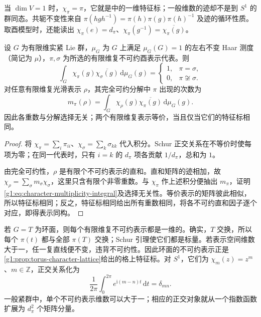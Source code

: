 当 \(\dim V=1\) 时，\(\chi_\pi=\pi\)，它就是中的一维特征标；一般维数的迹却不是到 \(S^1\) 的群同态。共轭不变性来自 \(\pi(hgh^{-1})=\pi(h)\pi(g)\pi(h)^{-1}\) 及迹的循环性质。取酉模型时，还能读出 \(\chi_\pi(e)=d_\pi\)、\(\chi_\pi(g^{-1})=\overline{\chi_\pi(g)}\)。

\begin{corollary}\label{g1:cor:character-orthogonality}
	设 \(G\) 为有限维实紧 Lie 群，\(\mu_G\) 为 \(G\) 上满足 \(\mu_G(G)=1\) 的左右不变 Haar 测度（简记为 \(\mu\)），\(\pi,\sigma\) 为所选的有限维复不可约酉表示代表。则
	\[
		\int_G\chi_\pi(g)\overline{\chi_\sigma(g)}\,\mathrm{d}\mu_G(g)
		=\begin{cases}1,&\pi=\sigma,\\0,&\pi\not\cong\sigma.\end{cases}
	\]
	对任意有限维复光滑表示 \(\rho\)，其完全可约分解中 \(\pi\) 出现的次数为
	\begin{equation}\label{g1:eq:character-multiplicity-integral}
		m_\pi(\rho)=\int_G\chi_\rho(g)\overline{\chi_\pi(g)}\,\mathrm{d}\mu_G(g).
	\end{equation}
	因此各重数与分解选择无关；两个有限维复表示等价，当且仅当它们的特征标相同。
\end{corollary}
\begin{proof}
	将 \(\chi_\pi=\sum_i\pi_{ii}\)、\(\chi_\sigma=\sum_k\sigma_{kk}\) 代入积分。Schur 正交关系在不等价时使每项为零；在同一代表时，只有 \(i=k\) 的 \(d_\pi\) 项各贡献 \(1/d_\pi\)，总和为 \(1\)。

	由完全可约性，\(\rho\) 是有限个不可约表示的直和。直和矩阵的迹相加，故 \(\chi_\rho=\sum_\sigma m_\sigma\chi_\sigma\)，这里只含有限个非零重数。与 \(\chi_\pi\) 作上述积分便抽出 \(m_\pi\)，证明\eqref{g1:eq:character-multiplicity-integral}及选择无关性。等价表示的矩阵彼此相似，所以特征标相同；反之，特征标相同给出所有重数相同，将各不可约直和因子逐个对应，即得表示同构。
\end{proof}

\begin{example}\label{g1:exm:torus-irreducible-representations}
	若 \(G=T\) 为环面，则每个有限维复不可约表示都是一维的。确实，\(T\) 交换，所以每个 \(\pi(t)\) 都与全部 \(\pi(T)\) 交换；Schur 引理使它们都是标量。若表示空间维数大于一，任一复直线便不变，违背不可约性。因此环面的不可约表示正是\cref{g1:prop:torus-character-lattice}给出的格上特征标。对 \(S^1\)，它们为 \(\chi_m(z)=z^m\)、\(m\in\mathbb Z\)，正交关系化为
	\[
		\frac1{2\pi}\int_0^{2\pi}e^{\mathrm{i}(m-n)t}\,\mathrm{d}t=\delta_{mn}.
	\]
	一般紧群中，单个不可约表示维数可以大于一；相应的正交对象就从一个指数函数扩展为 \(d_\pi^2\) 个矩阵分量。
\end{example}

